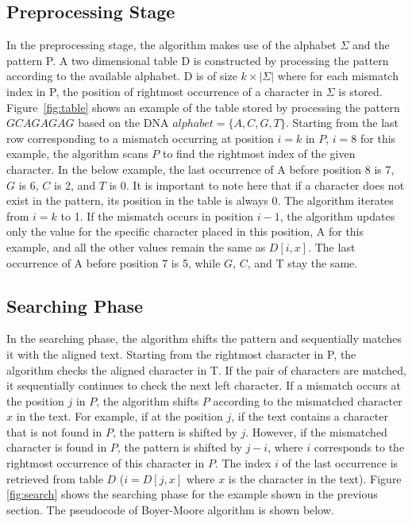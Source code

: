 \documentclass[paper=a4, fontsize=11pt]{scrartcl} %
\numberwithin{equation}{section} %
\numberwithin{figure}{section} %
\numberwithin{table}{section} %
\begin{document}
\subsection{Preprocessing Stage}
\par In the preprocessing stage, the algorithm makes use of the alphabet $\Sigma$ and the pattern P. A two dimensional table D is constructed by processing the pattern according to the available alphabet. D is of size $k\times|\Sigma|$ where for each mismatch index in P, the position of rightmost occurrence of a character in $\Sigma$ is stored. Figure~\ref{fig:table} shows an example of the table stored by processing the pattern $GCAGAGAG$ based on the DNA $alphabet=\{A,C,G,T\}$. Starting from the last row corresponding to a mismatch occurring at position $i=k$ in $P$, $i=8$ for this example, the algorithm scans $P$ to find the rightmost index of the given character. In the below example, the last occurrence of A before position 8 is 7, $G$ is 6, $C$ is 2, and $T$ is 0. It is important to note here that if a character does not exist in the pattern, its position in the table is always 0. The algorithm iterates from $i=k$ to 1. If the mismatch occurs in position $i-1$, the algorithm updates only the value for the specific character placed in this position, A for this example, and all the other values remain the same as $D[i,x]$. The last occurrence of A before position 7 is 5, while $G$, $C$, and T stay the same.


\subsection{Searching Phase}
\par In the searching phase, the algorithm shifts the pattern and sequentially matches it with the aligned text. Starting from the rightmost character in P, the algorithm checks the aligned character in T. If the pair of characters are matched, it sequentially continues to check the next left character. If a mismatch occurs at the position $j$ in $P$, the algorithm shifts $P$ according to the mismatched character $x$ in the text. For example, if at the position $j$, if the text contains a character that is not found in $P$, the pattern is shifted by $j$. However, if the mismatched character is found in $P$, the pattern is shifted by $j-i$, where $i$ corresponds to the rightmost occurrence of this character in $P$. The index $i$ of the last occurrence is retrieved from table $D$ ($i=D[j,x]$ where $x$ is the character in the text). Figure \ref{fig:search} shows the searching phase for the example shown in the previous section. The pseudocode of Boyer-Moore algorithm is shown below.
\end{document}
